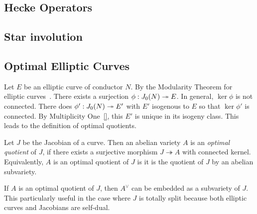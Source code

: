 \documentclass[11pt, proquest]{uwthesis}
\begin{document}
\subsection{Hecke Operators}%
\label{sub:hecke_operators}


\subsection{Star involution}%
\label{sub:star_involution}


\subsection{Optimal Elliptic Curves}%
\label{sub:optimal_elliptic_curves}

Let $E$ be an elliptic curve of conductor $N$. By the Modularity Theorem for
elliptic curves~\cite{breuil-conrad-diamond-taylor}. There exists a surjection
$\phi:J_0(N)\twoheadrightarrow E$. In general, $\ker\phi$ is not connected. There does
$\phi':J_0(N)\twoheadrightarrow E'$ with $E'$ isogenous to $E$ so that $\ker\phi'$ is
connected. By Multiplicity One~\ref{}, this $E'$ is unique in its isogeny
class. This leads to the definition of optimal quotients.
 
\begin{definition}%
    \label{defn:optimal_quotient}
    Let $J$ be the Jacobian of a curve. Then an abelian variety $A$ is an
    \emph{optimal quotient} of $J$, if there exists a surjective morphism $J
    \twoheadrightarrow A$ with connected kernel. Equivalently, $A$ is an
    optimal quotient of $J$ is it is the quotient of $J$ by an abelian
    subvariety.
\end{definition}

If $A$ is an optimal quotient of $J$, then $A^\vee$ can be embedded as a
subvariety of $J$. This particularly useful in the case where $J$ is totally
split because both elliptic curves and Jacobians are self-dual.
\end{document}
